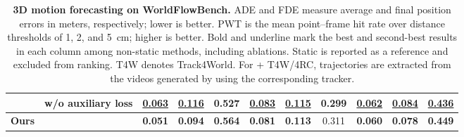 \begin{table}[t]
{\begin{tabular}{@{}ll ccc ccc ccc@{}}
& \method{} w/o auxiliary loss
& \underline{0.063} & \underline{0.116} & 0.527
& \underline{0.083} & \underline{0.115} & 0.299
& \underline{0.062} & \underline{0.084} & \underline{0.436} \\
\midrule
\textbf{Ours}
& \method{}
& \textbf{0.051} & \textbf{0.094} & \textbf{0.564}
& \textbf{0.081} & \textbf{0.113} & 0.311
& \textbf{0.060} & \textbf{0.078} & \textbf{0.449} \\
\bottomrule
\end{tabular}%
}
\caption{
\textbf{3D motion forecasting on WorldFlowBench.}
ADE and FDE measure average and final position errors
in meters, respectively; lower is better.
PWT is the mean point--frame hit rate over distance
thresholds of 1, 2, and 5~cm; higher is better.
Bold and underline mark the best and second-best results
in each column among non-static methods, including ablations.
Static is reported as a reference and excluded from ranking.
T4W denotes Track4World.
For \method{} + T4W/4RC, trajectories are extracted from
the videos generated by \method{} using the corresponding
tracker.
}
\label{tab:worldflowbench}
\end{table}